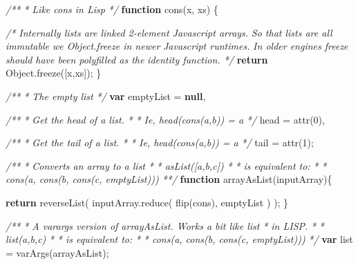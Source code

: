 \documentclass[12pt, ]{article}
\newenvironment{Shaded}{}{}
\newcommand{\KeywordTok}[1]{\textcolor[rgb]{0.00,0.44,0.13}{\textbf{{#1}}}}
\newcommand{\DecValTok}[1]{\textcolor[rgb]{0.25,0.63,0.44}{{#1}}}
\newcommand{\CommentTok}[1]{\textcolor[rgb]{0.38,0.63,0.69}{\textit{{#1}}}}
\newcommand{\OtherTok}[1]{\textcolor[rgb]{0.00,0.44,0.13}{{#1}}}
\newcommand{\FunctionTok}[1]{\textcolor[rgb]{0.02,0.16,0.49}{{#1}}}
\newcommand{\NormalTok}[1]{{#1}}
\begin{document}
\pagebreak


\label{src_lists}

\begin{Shaded}
\begin{Highlighting}[]
\CommentTok{/**}
\CommentTok{ * Like cons in Lisp}
\CommentTok{ */}
\KeywordTok{function} \FunctionTok{cons}\NormalTok{(x, xs) \{}
   
   \CommentTok{/* Internally lists are linked 2-element Javascript arrays.}
\CommentTok{    }
\CommentTok{      So that lists are all immutable we Object.freeze in newer }
\CommentTok{      Javascript runtimes.}
\CommentTok{      }
\CommentTok{      In older engines freeze should have been polyfilled as the }
\CommentTok{      identity function. */}
   \KeywordTok{return} \OtherTok{Object}\NormalTok{.}\FunctionTok{freeze}\NormalTok{([x,xs]);}
\NormalTok{\}}

\CommentTok{/**}
\CommentTok{ * The empty list}
\CommentTok{ */}
\KeywordTok{var} \NormalTok{emptyList = }\KeywordTok{null}\NormalTok{,}

\CommentTok{/**}
\CommentTok{ * Get the head of a list.}
\CommentTok{ * }
\CommentTok{ * Ie, head(cons(a,b)) = a}
\CommentTok{ */}
    \NormalTok{head = }\FunctionTok{attr}\NormalTok{(}\DecValTok{0}\NormalTok{),}

\CommentTok{/**}
\CommentTok{ * Get the tail of a list.}
\CommentTok{ * }
\CommentTok{ * Ie, head(cons(a,b)) = a}
\CommentTok{ */}
    \NormalTok{tail = }\FunctionTok{attr}\NormalTok{(}\DecValTok{1}\NormalTok{);}


\CommentTok{/** }
\CommentTok{ * Converts an array to a list }
\CommentTok{ * }
\CommentTok{ *    asList([a,b,c])}
\CommentTok{ * }
\CommentTok{ * is equivalent to:}
\CommentTok{ *    }
\CommentTok{ *    cons(a, cons(b, cons(c, emptyList))) }
\CommentTok{ **/}
\KeywordTok{function} \FunctionTok{arrayAsList}\NormalTok{(inputArray)\{}

   \KeywordTok{return} \FunctionTok{reverseList}\NormalTok{( }
      \OtherTok{inputArray}\NormalTok{.}\FunctionTok{reduce}\NormalTok{(}
         \FunctionTok{flip}\NormalTok{(cons),}
         \NormalTok{emptyList }
      \NormalTok{)}
   \NormalTok{);}
\NormalTok{\}}

\CommentTok{/**}
\CommentTok{ * A varargs version of arrayAsList. Works a bit like list}
\CommentTok{ * in LISP.}
\CommentTok{ * }
\CommentTok{ *    list(a,b,c) }
\CommentTok{ *    }
\CommentTok{ * is equivalent to:}
\CommentTok{ * }
\CommentTok{ *    cons(a, cons(b, cons(c, emptyList)))}
\CommentTok{ */}
\KeywordTok{var} \NormalTok{list = }\FunctionTok{varArgs}\NormalTok{(arrayAsList);}


\end{Highlighting}
\end{Shaded}
\end{document}
